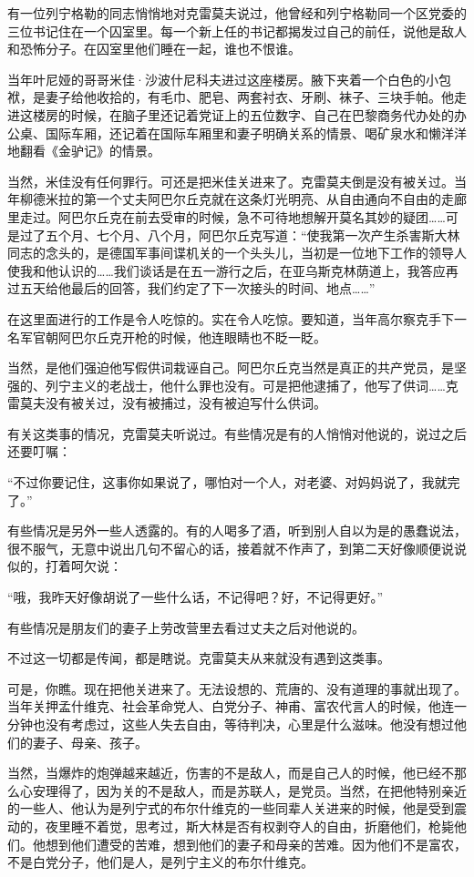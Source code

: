 有一位列宁格勒的同志悄悄地对克雷莫夫说过，他曾经和列宁格勒同一个区党委的三位书记住在一个囚室里。每一个新上任的书记都揭发过自己的前任，说他是敌人和恐怖分子。在囚室里他们睡在一起，谁也不恨谁。

当年叶尼娅的哥哥米佳·沙波什尼科夫进过这座楼房。腋下夹着一个白色的小包袱，是妻子给他收拾的，有毛巾、肥皂、两套衬衣、牙刷、袜子、三块手帕。他走进这楼房的时候，在脑子里还记着党证上的五位数字、自己在巴黎商务代办处的办公桌、国际车厢，还记着在国际车厢里和妻子明确关系的情景、喝矿泉水和懒洋洋地翻看《金驴记》的情景。

当然，米佳没有任何罪行。可还是把米佳关进来了。克雷莫夫倒是没有被关过。当年柳德米拉的第一个丈夫阿巴尔丘克就在这条灯光明亮、从自由通向不自由的走廊里走过。阿巴尔丘克在前去受审的时候，急不可待地想解开莫名其妙的疑团……可是过了五个月、七个月、八个月，阿巴尔丘克写道：“使我第一次产生杀害斯大林同志的念头的，是德国军事间谍机关的一个头头儿，当初是一位地下工作的领导人使我和他认识的……我们谈话是在五一游行之后，在亚乌斯克林荫道上，我答应再过五天给他最后的回答，我们约定了下一次接头的时间、地点……”

在这里面进行的工作是令人吃惊的。实在令人吃惊。要知道，当年高尔察克手下一名军官朝阿巴尔丘克开枪的时候，他连眼睛也不眨一眨。

当然，是他们强迫他写假供词栽诬自己。阿巴尔丘克当然是真正的共产党员，是坚强的、列宁主义的老战士，他什么罪也没有。可是把他逮捕了，他写了供词……克雷莫夫没有被关过，没有被捕过，没有被迫写什么供词。

有关这类事的情况，克雷莫夫听说过。有些情况是有的人悄悄对他说的，说过之后还要叮嘱：

“不过你要记住，这事你如果说了，哪怕对一个人，对老婆、对妈妈说了，我就完了。”

有些情况是另外一些人透露的。有的人喝多了酒，听到别人自以为是的愚蠢说法，很不服气，无意中说出几句不留心的话，接着就不作声了，到第二天好像顺便说说似的，打着呵欠说：

“哦，我昨天好像胡说了一些什么话，不记得吧？好，不记得更好。”

有些情况是朋友们的妻子上劳改营里去看过丈夫之后对他说的。

不过这一切都是传闻，都是瞎说。克雷莫夫从来就没有遇到这类事。

可是，你瞧。现在把他关进来了。无法设想的、荒唐的、没有道理的事就出现了。当年关押孟什维克、社会革命党人、白党分子、神甫、富农代言人的时候，他连一分钟也没有考虑过，这些人失去自由，等待判决，心里是什么滋味。他没有想过他们的妻子、母亲、孩子。

当然，当爆炸的炮弹越来越近，伤害的不是敌人，而是自己人的时候，他已经不那么心安理得了，因为关的不是敌人，而是苏联人，是党员。当然，在把他特别亲近的一些人、他认为是列宁式的布尔什维克的一些同辈人关进来的时候，他是受到震动的，夜里睡不着觉，思考过，斯大林是否有权剥夺人的自由，折磨他们，枪毙他们。他想到他们遭受的苦难，想到他们的妻子和母亲的苦难。因为他们不是富农，不是白党分子，他们是人，是列宁主义的布尔什维克。

